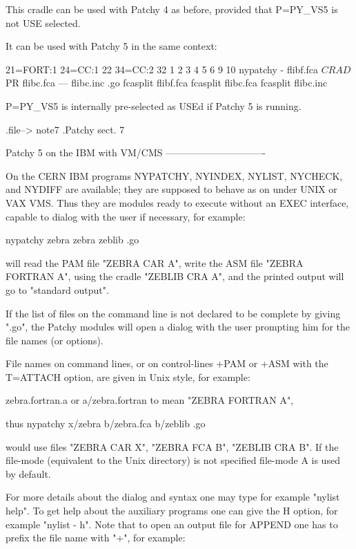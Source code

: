 This cradle can be used with Patchy 4 as before, provided that
P=PY_VS5 is not USE selected.

It can be used with Patchy 5 in the same context:

                     21=FORT:1           24=CC:1   22   34=CC:2   32
                   1 2         3     4   5         6    9         10
          nypatchy - flibf.fca $CRAD $PR flibc.fca ---  flibc.inc .go
          fcasplit flibf.fca
          fcasplit flibc.fca
          fcasplit flibc.inc

P=PY_VS5 is internally pre-selected as USEd if Patchy 5 is running.

.file-->  note7
.Patchy sect. 7





                 Patchy 5 on the IBM with VM/CMS
                 -------------------------------


On the CERN IBM programs NYPATCHY, NYINDEX, NYLIST, NYCHECK, and
NYDIFF are available; they are supposed to behave as on under UNIX
or VAX VMS. Thus they are modules ready to execute without an EXEC
interface, capable to dialog with the user if necessary, for example:

      nypatchy  zebra zebra zeblib .go

 will read the PAM file "ZEBRA CAR A",
     write the ASM file "ZEBRA FORTRAN A",
     using the cradle   "ZEBLIB CRA A",
 and the printed output will go to "standard output".


If the list of files on the command line is not declared to be
complete by giving ".go", the Patchy modules will open a dialog
with the user prompting him for the file names (or options).


File names on command lines, or on control-lines +PAM or +ASM with
the T=ATTACH option, are given in Unix style, for example:

  zebra.fortran.a  or  a/zebra.fortran  to mean "ZEBRA FORTRAN A",

thus    nypatchy  x/zebra b/zebra.fca b/zeblib  .go

would use files  "ZEBRA CAR X", "ZEBRA FCA B", "ZEBLIB CRA B".
If the file-mode (equivalent to the Unix directory) is not
specified file-mode A is used by default.


For more details about the dialog and syntax one may type
for example "nylist help". To get help about the auxiliary
programs one can give the H option, for example "nylist - h".
Note that to open an output file for APPEND one has to prefix
the file name with "+", for example:

